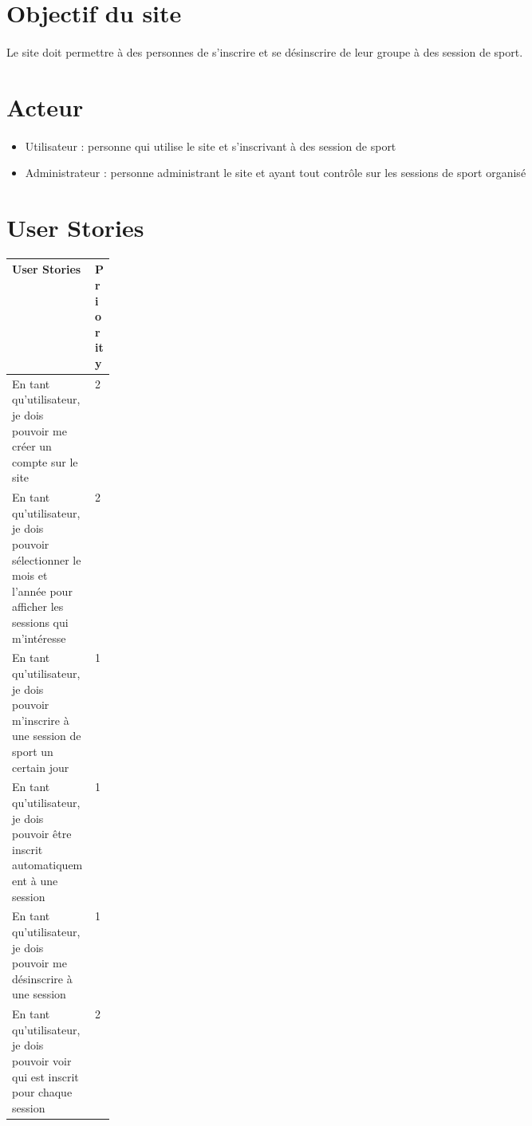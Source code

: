 
\section{Objectif du site}
	\paragraph{}
		Le site doit permettre à des personnes de s’inscrire et se désinscrire de leur groupe à des session de sport. 
		
		
\section{Acteur}
	\paragraph{}
		\begin{itemize}
			\item Utilisateur : personne qui utilise le site et s'inscrivant à des session de sport
			\item Administrateur : personne administrant le site et ayant tout contrôle sur les sessions de sport organisé
		\end{itemize}
		

\section{User Stories}
	\begin{center}
		\begin{tabularx}{\linewidth}{| Y | T{0.15\linewidth} |}
			\hline
			User Stories & Priority \\
			\hline
			En tant qu’utilisateur, je dois pouvoir me créer un compte sur le site & 2 \\
			\hline
			En tant qu'utilisateur, je dois pouvoir sélectionner le mois et l'année pour afficher les sessions qui m'intéresse & 2 \\
			\hline
			En tant qu’utilisateur, je dois pouvoir m’inscrire à une session de sport un certain jour & 1 \\
			\hline
			En tant qu’utilisateur, je dois pouvoir être inscrit automatiquement à une session & 1 \\
			\hline
			En tant qu’utilisateur, je dois pouvoir me désinscrire à une session & 1 \\
			\hline
			En tant qu’utilisateur, je dois pouvoir voir qui est inscrit pour chaque session & 2 \\
			\hline

		\end{tabularx}
	\end{center}
	
